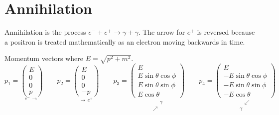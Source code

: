 

\section*{Annihilation}

Annihilation is the process $e^-+e^+\rightarrow\gamma+\gamma$.
The arrow for $e^+$ is reversed because a positron is treated
mathematically as an electron moving backwards in time.

\begin{center}
\end{center}

Momentum vectors where $E=\sqrt{p^2+m^2}$.
\begin{equation*}
p_1=\underset{e^- \, \longrightarrow}
{\begin{pmatrix}E\\0\\0\\p\end{pmatrix}}
\qquad
p_2=\underset{\longrightarrow \, e^+}
{\begin{pmatrix}E\\0\\0\\-p\end{pmatrix}}
\qquad
p_3=\underset{\substack{\phantom{\nearrow} \, \gamma\\\nearrow \, \phantom{\gamma}}}
{\begin{pmatrix}E\\ E\sin\theta\cos\phi\\ E\sin\theta\sin\phi\\ E\cos\theta\end{pmatrix}}
\qquad
p_4=\underset{\substack{\phantom{\gamma} \, \swarrow\\\gamma \, \phantom{\swarrow}}}
{\begin{pmatrix}E\\ -E\sin\theta\cos\phi\\ -E\sin\theta\sin\phi\\ -E\cos\theta\end{pmatrix}}
\end{equation*}

